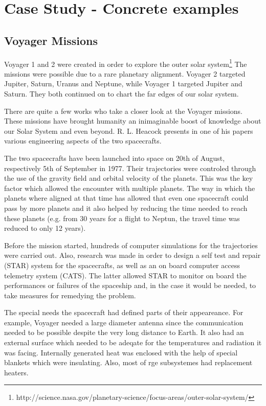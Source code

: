 \section{Case Study - Concrete examples}


\subsection{Voyager Missions}

Voyager 1 and 2 \cite{vo1-nasa}\cite{vo2-nasa} were created in order to explore
the outer solar
system\footnote{http://science.nasa.gov/planetary-science/focus-areas/outer-solar-system/}
The missions were possible due to a rare planetary alignment. Voyager 2 targeted
Jupiter, Saturn, Uranus and Neptune, while Voyager 1 targeted Jupiter and
Saturn. They both continued on to chart the far edges of our solar system.

There are quite a few works who take a closer look at the Voyager missions.
These missions have brought humanity an inimaginable boost of knowledge about
our Solar System and even beyond. R. L. Heacock presents in one of his
papers~\cite{tvs} various engineering aspects of the two spacecrafts.

The two spacecrafts have been launched into space on 20th of August,
respectively 5th of September in 1977. Their trajectories were controled through
the use of the gravity field and orbital velocity of the planets. This was the
key factor which allowed the encounter with multiple planets. The way in which
the planets where aligned at that time has allowed that even one spacecraft
could pass by more planets and it also helped by reducing the time needed to
reach these planets (e.g. from 30 years for a flight to Neptun, the travel time
was reduced to only 12 years).

Before the mission started, hundreds of computer simulations for the
trajectories were carried out. Also, research was made in order to design a self
test and repair (STAR) system for the spacecrafts, as well as an on board
computer access telemetry system (CATS). The latter allowed STAR to monitor on
board the performances or failures of the spaceship and, in the case it would be
needed, to take measures for remedying the problem.

The special needs the spacecraft had defined parts of their appeareance. For
example, Voyager needed a large diameter antenna since the communication needed
to be possible despite the very long distance to Earth. It also had an external
surface which needed to be adeqate for the temperatures and radiation it was
facing. Internally generated heat was enclosed with the help of special blankets
which were insulating. Also, most of rge subsystemes had replacement heaters.

